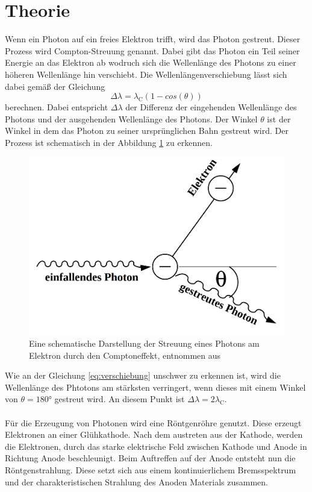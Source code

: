 \section{Theorie}
\label{sec:Theorie}

Wenn ein Photon auf ein freies Elektron trifft, wird das Photon gestreut.
Dieser Prozess wird Compton-Streuung genannt.
Dabei gibt das Photon ein Teil seiner Energie an das Elektron ab wodruch sich die Wellenlänge des Photons zu einer höheren Wellenlänge hin verschiebt.
Die Wellenlängenverschiebung lässt sich dabei gemäß der Gleichung 
\begin{equation}
    \Delta \lambda = \lambda _\text{C}(1-cos(\theta))
    \label{eq:verschiebung}
\end{equation}
berechnen.
Dabei entspricht $\Delta \lambda$ der Differenz der eingehenden Wellenlänge des Photons und der ausgehenden Wellenlänge des Photons.
Der Winkel $\theta$ ist der Winkel in dem das Photon zu seiner ursprünglichen Bahn gestreut wird.
Der Prozess ist schematisch in der Abbildung \ref{fig:streuung} zu erkennen.
\begin{figure}
    \centering
    \includegraphics[width=\textwidth/2]{content/data/streuung.png}
    \caption{Eine schematische Darstellung der Streuung eines Photons am Elektron durch den Comptoneffekt, entnommen aus \cite{anleitung}}
    \label{fig:streuung}
\end{figure}
Wie an der Gleichung \eqref{eq:verschiebung} unschwer zu erkennen ist, wird die Wellenlänge des Phtotons am stärksten verringert, wenn dieses mit einem Winkel von $\theta = 180 \si{\degree}$ gestreut wird.
An diesem Punkt ist $\Delta \lambda = 2 \lambda _\text{C}$.
\\\\
Für die Erzeugung von Photonen wird eine Röntgenröhre genutzt.
Diese erzeugt Elektronen an einer Glühkathode.
Nach dem austreten aus der Kathode, werden die Elektronen, durch das starke elektrische Feld zwischen Kathode und Anode in Richtung Anode beschleunigt.
Beim Auftreffen auf der Anode entsteht nun die Röntgenstrahlung.
Diese setzt sich aus einem kontinuierlichem Bremsspektrum und der charakteristischen Strahlung des Anoden Materials zusammen.


